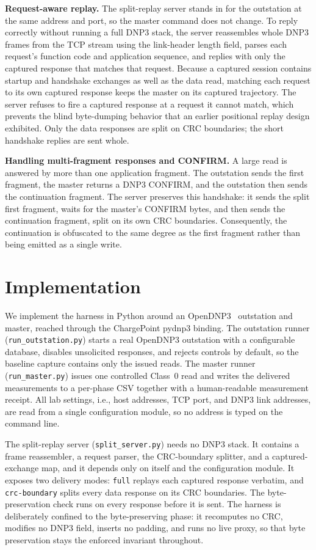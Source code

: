 \documentclass[conference]{IEEEtran}
\newcommand{\code}[1]{\texttt{#1}}
\begin{document}
\noindent\textbf{Request-aware replay.} The split-replay server stands in for the
outstation at the same address and port, so the master command does not change.
To reply correctly without running a full DNP3 stack, the server reassembles
whole DNP3 frames from the TCP stream using the link-header length field, parses
each request's function code and application sequence, and replies with only the
captured response that matches that request. Because a captured session contains
startup and handshake exchanges as well as the data read, matching each request
to its own captured response keeps the master on its captured trajectory. The
server refuses to fire a captured response at a request it cannot match, which
prevents the blind byte-dumping behavior that an earlier positional replay design
exhibited. Only the data responses are split on CRC boundaries; the short
handshake replies are sent whole.

\noindent\textbf{Handling multi-fragment responses and CONFIRM.} A large read is
answered by more than one application fragment. The outstation sends the first
fragment, the master returns a DNP3 CONFIRM, and the outstation then sends the
continuation fragment. The server preserves this handshake: it sends the split
first fragment, waits for the master's CONFIRM bytes, and then sends the
continuation fragment, split on its own CRC boundaries. Consequently, the
continuation is obfuscated to the same degree as the first fragment rather than
being emitted as a single write.

\section{Implementation}

We implement the harness in Python around an OpenDNP3~\cite{ref:opendnp3}
outstation and master, reached through the ChargePoint pydnp3 binding. The
outstation runner (\code{run\_outstation.py}) starts a real OpenDNP3 outstation
with a configurable database, disables unsolicited responses, and rejects
controls by default, so the baseline capture contains only the issued reads. The
master runner (\code{run\_master.py}) issues one controlled Class~0 read and
writes the delivered measurements to a per-phase CSV together with a
human-readable measurement receipt. All lab settings, i.e., host addresses, TCP
port, and DNP3 link addresses, are read from a single configuration module, so no
address is typed on the command line.

The split-replay server (\code{split\_server.py}) needs no DNP3 stack. It
contains a frame reassembler, a request parser, the CRC-boundary splitter, and a
captured-exchange map, and it depends only on itself and the configuration
module. It exposes two delivery modes: \code{full} replays each captured response
verbatim, and \code{crc-boundary} splits every data response on its CRC
boundaries. The byte-preservation check runs on every response before it is sent.
The harness is deliberately confined to the byte-preserving phase: it recomputes
no CRC, modifies no DNP3 field, inserts no padding, and runs no live proxy, so
that byte preservation stays the enforced invariant throughout.
\end{document}
